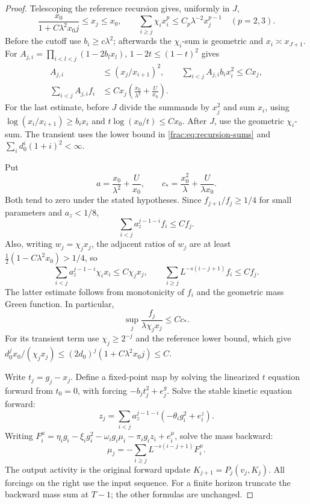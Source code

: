 \documentclass[11pt]{article}
\begin{document}
\begin{proof}
Telescoping the reference recursion gives, uniformly in \(J\),
\begin{equation}\label{frac:eq:recursion-sums}
 \frac{x_0}{1+C\lambda^2x_0j}\le x_j\le x_0,
 \qquad \sum_{i\ge j}\chi_i x_i^p
       \le C_p\lambda^{-2}x_j^{p-1}\quad(p=2,3).
\end{equation}
Before the cutoff use \(b_i\ge c\lambda^2\); afterwards the
\(\chi_i\)-sum is geometric and \(x_i\asymp x_{J+1}\).
For \(A_{j,i}=\prod_{i<l<j}(1-2b_lx_l)\),
\(1-2t\le(1-t)^2\) gives
\begin{align}
 A_{j,i}&\le(x_j/x_{i+1})^2,\qquad
 \sum_{i<j}A_{j,i}b_ix_i^2\le Cx_j,\nonumber\\
 \sum_{i<j}A_{j,i}f_i
   &\le Cx_j\left(\frac{x_0}{\lambda^2}+\frac U{x_0}\right).
      \label{frac:eq:forward-sum}
\end{align}
For the last estimate, before \(J\) divide the summands by
\(x_j^2\) and sum \(x_i\), using
\(\log(x_i/x_{i+1})\ge b_ix_i\) and
\(t\log(x_0/t)\le Cx_0\). After \(J\), use the geometric
\(\chi_i\)-sum. The transient uses the lower bound in
\eqref{frac:eq:recursion-sums} and
\(\sum_i d_0^i(1+i)^2<\infty\).

Put
\[
 a=\frac{x_0}{\lambda^2}+\frac U{x_0},\qquad
 c_* =\frac{x_0^2}{\lambda}+\frac U{\lambda x_0}.
\]
Both tend to zero under the stated hypotheses. Since
\(f_{j+1}/f_j\ge1/4\) for small parameters and \(a_z<1/8\),
\[
 \sum_{i<j}a_z^{j-1-i}f_i\le C f_j.
\]
Also, writing \(w_j=\chi_jx_j\), the adjacent ratios of \(w_j\)
are at least \(\tfrac12(1-C\lambda^2x_0)>1/4\), so
\[
 \sum_{i<j}a_z^{j-1-i}\chi_i x_i\le C\chi_jx_j,
 \qquad
 \sum_{i\ge j}L^{-s(i-j+1)}f_i\le C f_j.
\]
The latter estimate follows from monotonicity of \(f_i\) and the
geometric mass Green function. In particular,
\begin{equation}\label{frac:eq:f-over-mass-weight}
 \sup_j\frac{f_j}{\lambda\chi_jx_j}\le Cc_*.
\end{equation}
For its transient term use \(\chi_j\ge2^{-j}\) and the reference
lower bound, which give
\(d_0^j x_0/(\chi_jx_j)\le
(2d_0)^j(1+C\lambda^2x_0j)\le C\).

Write \(t_j=g_j-x_j\). Define a fixed-point map by solving the
linearized \(t\) equation forward from \(t_0=0\), with forcing
\(-b_jt_j^2+e_j^g\). Solve the stable kinetic equation forward:
\[
 z_j=\sum_{i<j}a_z^{j-1-i}(-\theta_i g_i^2+e_i^z).
\]
Writing \(F_i^\mu=\eta_i g_i-\xi_i g_i^2-
\omega_i g_i\mu_i-\pi_i g_i z_i+e_i^\mu\), solve the mass
backward:
\[
 \mu_j=-\sum_{i\ge j}L^{-s(i-j+1)}F_i^\mu.
\]
The output activity is the original forward update
\(K_{j+1}=P_j(v_j,K_j)\). All forcings on the right use the input
sequence. For a finite horizon truncate the backward mass sum at
\(T-1\); the other formulas are unchanged.


\end{proof}
\end{document}
